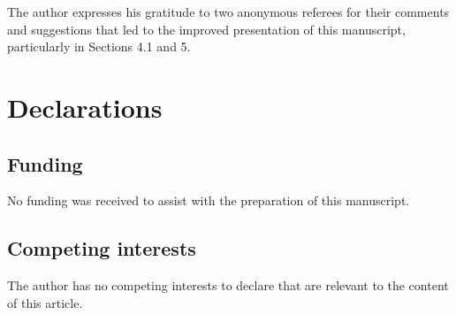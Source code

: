 \documentclass[oneside]{amsart}
\theoremstyle{plain}
\theoremstyle{definition}
\theoremstyle{remark}
\numberwithin{equation}{section}
\begin{document}
The author expresses his gratitude to two anonymous referees for their
comments and suggestions that led to the improved presentation of this
manuscript, particularly in Sections 4.1 and 5.

\section*{Declarations}

\subsection*{Funding}
No funding was received to assist with the preparation of this manuscript.

\subsection*{Competing interests}
The author has no competing interests to declare that are relevant to the
content of this article.
\end{document}
